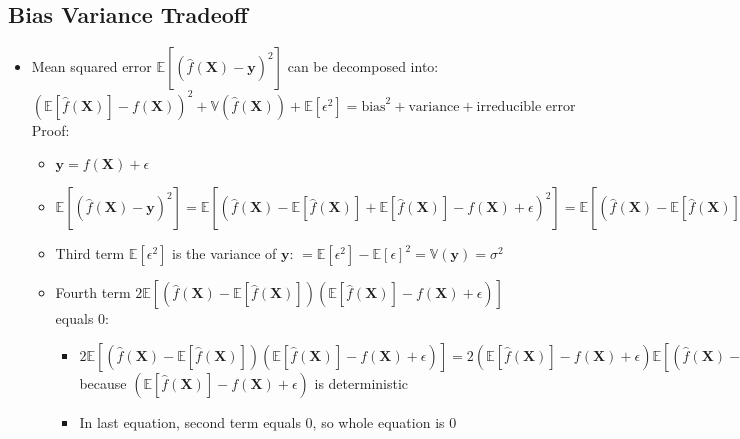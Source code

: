 \subsection*{Bias Variance Tradeoff}
\begin{itemize}
    \item Mean squared error $\mathbb{E}[ (\hat{f}(\boldsymbol{X}) - \boldsymbol{y})^2 ]$ can be decomposed into: $( \mathbb{E}[\hat{f}(\boldsymbol{X})] - f(\boldsymbol{X}) )^2 + \mathbb{V}(\hat{f}(\boldsymbol{X})) + \mathbb{E}[\epsilon^2] = \textrm{bias}^2 + \textrm{variance} + \textrm{irreducible error}$\\
    Proof:
    \begin{itemize}
        \item $\boldsymbol{y} = f(\boldsymbol{X}) + \epsilon$
        \item $\mathbb{E}[ (\hat{f}(\boldsymbol{X}) - \boldsymbol{y})^2 ] = \mathbb{E}[ (\hat{f}(\boldsymbol{X}) - \mathbb{E}[\hat{f}(\boldsymbol{X})] + \mathbb{E}[\hat{f}(\boldsymbol{X})] - f(\boldsymbol{X}) + \epsilon)^2 ] = \mathbb{E}[ (\hat{f}(\boldsymbol{X}) - \mathbb{E}[\hat{f}(\boldsymbol{X})] )^2 ] + \mathbb{E}[(\mathbb{E}[\hat{f}(\boldsymbol{X})] - f(\boldsymbol{X}))^2] + \mathbb{E}[\epsilon^2] - 2 \mathbb{E}[ (\hat{f}(\boldsymbol{X}) - \mathbb{E} [ \hat{f}(\boldsymbol{X}) ] ) ( \mathbb{E} [ \hat{f}(\boldsymbol{X}) ] - f(\boldsymbol{X}) + \epsilon ) ]$
        \item Third term $\mathbb{E}[\epsilon^2]$ is the variance of $\boldsymbol{y}$: $ = \mathbb{E}[\epsilon^2] - \mathbb{E}[\epsilon]^2 = \mathbb{V}(\boldsymbol{y}) = \sigma^2$
        \item Fourth term $2 \mathbb{E}[ (\hat{f}(\boldsymbol{X}) - \mathbb{E} [ \hat{f}(\boldsymbol{X}) ] ) ( \mathbb{E} [ \hat{f}(\boldsymbol{X}) ] - f(\boldsymbol{X}) + \epsilon ) ]$ equals 0:
        \begin{itemize}
            \item $2 \mathbb{E}[ (\hat{f}(\boldsymbol{X}) - \mathbb{E} [ \hat{f}(\boldsymbol{X}) ] ) ( \mathbb{E} [ \hat{f}(\boldsymbol{X}) ] - f(\boldsymbol{X}) + \epsilon ) ] = 2( \mathbb{E} [ \hat{f}(\boldsymbol{X}) ] - f(\boldsymbol{X}) + \epsilon ) \mathbb{E}[ (\hat{f}(\boldsymbol{X}) - \mathbb{E} [ \hat{f}(\boldsymbol{X}) ] ) ]$ because $( \mathbb{E} [ \hat{f}(\boldsymbol{X}) ] - f(\boldsymbol{X}) + \epsilon ) $ is deterministic
            \item In last equation, second term equals 0, so whole equation is 0
        \end{itemize}

\end{itemize}
\end{itemize}
